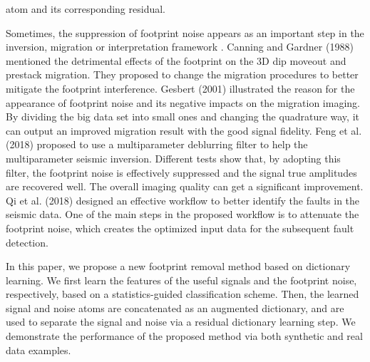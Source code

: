 atom and its corresponding residual. %

Sometimes, the suppression of footprint noise appears as an important step in the inversion, migration or interpretation framework \cite{Lee2005mig}. Canning and Gardner (1988) \cite{Canning1998ft} mentioned the detrimental effects of the footprint on the 3D dip moveout and prestack migration. They proposed to change the migration procedures to better mitigate the footprint interference. Gesbert (2001) \cite{Gesbert2001ft} illustrated the reason for the appearance of footprint noise and its negative impacts on the migration imaging. By dividing the big data set into small ones and changing the quadrature way, it can output an improved migration result with the good signal fidelity. Feng et al. (2018) \cite{Feng2018deblurring} proposed to use a multiparameter deblurring filter to help the multiparameter seismic inversion. Different tests show that, by adopting this filter,  the footprint noise is effectively suppressed and the signal true amplitudes are recovered well. The overall imaging quality can get a significant improvement. Qi et al. (2018) \cite{Qi2018fault} designed an effective workflow to better identify the faults in the seismic data. One of the main steps in the proposed workflow is to attenuate the footprint noise, which creates the optimized input data for the subsequent fault detection.

In this paper, we propose a new footprint removal method based on dictionary learning. We first learn the features of the useful signals and the footprint noise, respectively, based on a statistics-guided classification scheme. Then, the learned signal and noise atoms are concatenated as an augmented dictionary, and are used to separate the signal and noise via a residual dictionary learning step. We demonstrate the performance of the proposed method via both synthetic and real data examples. 

